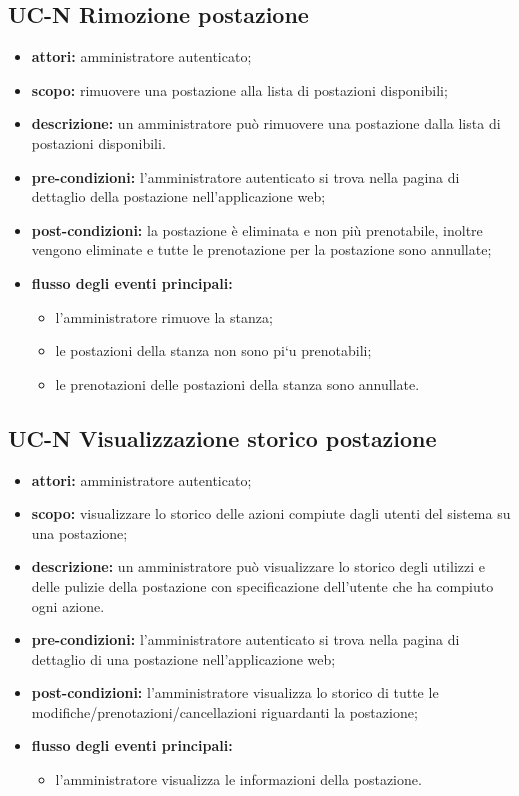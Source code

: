 \subsection{UC-N Rimozione postazione}
\begin{itemize}
    \item \textbf{attori:} amministratore autenticato;
    \item \textbf{scopo:} rimuovere una postazione alla lista di postazioni disponibili;
    \item \textbf{descrizione:} un amministratore pu\`{o} rimuovere una postazione dalla lista di postazioni disponibili.
    \item \textbf{pre-condizioni:} l'amministratore autenticato si trova nella pagina di dettaglio della postazione nell'applicazione web;
    \item \textbf{post-condizioni:} la postazione \`{e} eliminata e non pi\`{u} prenotabile, inoltre vengono eliminate e  tutte le prenotazione per la postazione sono annullate;
    \item \textbf{flusso degli eventi principali:}
    \begin{itemize}
        \item l'amministratore rimuove la stanza;
        \item le postazioni della stanza non sono pi`{u} prenotabili;
        \item le prenotazioni delle postazioni della stanza sono annullate.
    \end{itemize}
\end{itemize}


\subsection{UC-N Visualizzazione storico postazione}
\begin{itemize}
    \item \textbf{attori:} amministratore autenticato;
    \item \textbf{scopo:} visualizzare lo storico delle azioni compiute dagli utenti del sistema su una postazione;
    \item \textbf{descrizione:} un amministratore pu\`{o} visualizzare lo storico degli utilizzi e delle pulizie della postazione con specificazione dell'utente che ha compiuto ogni azione.
    \item \textbf{pre-condizioni:} l'amministratore autenticato si trova nella pagina di dettaglio di una postazione nell'applicazione web;
    \item \textbf{post-condizioni:} l'amministratore visualizza lo storico di tutte le modifiche/prenotazioni/cancellazioni riguardanti la postazione;
    \item \textbf{flusso degli eventi principali:}
    \begin{itemize}
        \item l'amministratore visualizza le informazioni della postazione.
    \end{itemize}
\end{itemize}



